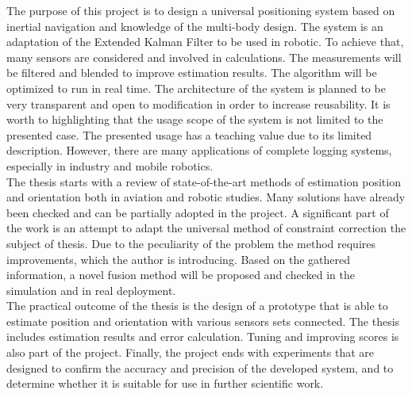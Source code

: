 The purpose of this project is to design a universal positioning system based on inertial navigation and knowledge of the multi-body design. The system is an adaptation of the Extended Kalman Filter to be used in robotic. To achieve that, many sensors are considered and involved in calculations. The measurements will be filtered and blended to improve estimation results. The algorithm will be optimized to run in real time. The architecture of the system is planned to be very transparent and open to modification in order to increase reusability. It is worth to highlighting that the usage scope of the system is not limited to the presented case. The presented usage has a teaching value due to its limited description. However, there are many applications of complete logging systems, especially in industry and mobile robotics.\\

The thesis starts with a review of state-of-the-art methods of estimation position and orientation both in aviation and robotic studies. Many solutions have already been checked and can be partially adopted in the project. A significant part of the work is an attempt to adapt the universal method of constraint correction the subject of thesis. Due to the peculiarity of the problem the method requires improvements, which the author is introducing. Based on the gathered information, a novel fusion method will be proposed and checked in the simulation and in real deployment.\\

The practical outcome of the thesis is the design of a prototype that is able to estimate position and orientation with various sensors sets connected. The thesis includes estimation results and error calculation. Tuning and improving scores is also part of the project. Finally, the project ends with experiments that are designed to confirm the accuracy and precision of the developed system, and to determine whether it is suitable for use in further scientific work. 